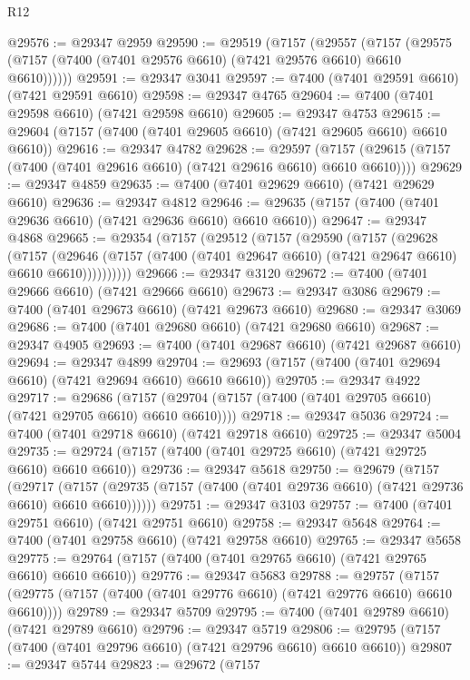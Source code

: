 \begin{lexlean}{R12}
\begin{coremodule}
@29576 := @29347 @2959
@29590 := @29519
    (@7157
      (@29557
        (@7157 (@29575 (@7157 (@7400 (@7401 @29576 @6610) (@7421 @29576 @6610) @6610 @6610))))))
@29591 := @29347 @3041
@29597 := @7400 (@7401 @29591 @6610) (@7421 @29591 @6610)
@29598 := @29347 @4765
@29604 := @7400 (@7401 @29598 @6610) (@7421 @29598 @6610)
@29605 := @29347 @4753
@29615 := @29604 (@7157 (@7400 (@7401 @29605 @6610) (@7421 @29605 @6610) @6610 @6610))
@29616 := @29347 @4782
@29628 := @29597
    (@7157 (@29615 (@7157 (@7400 (@7401 @29616 @6610) (@7421 @29616 @6610) @6610 @6610))))
@29629 := @29347 @4859
@29635 := @7400 (@7401 @29629 @6610) (@7421 @29629 @6610)
@29636 := @29347 @4812
@29646 := @29635 (@7157 (@7400 (@7401 @29636 @6610) (@7421 @29636 @6610) @6610 @6610))
@29647 := @29347 @4868
@29665 := @29354
    (@7157
      (@29512
        (@7157
          (@29590
            (@7157
              (@29628
                (@7157
                  (@29646
                    (@7157 (@7400 (@7401 @29647 @6610) (@7421 @29647 @6610) @6610 @6610))))))))))
@29666 := @29347 @3120
@29672 := @7400 (@7401 @29666 @6610) (@7421 @29666 @6610)
@29673 := @29347 @3086
@29679 := @7400 (@7401 @29673 @6610) (@7421 @29673 @6610)
@29680 := @29347 @3069
@29686 := @7400 (@7401 @29680 @6610) (@7421 @29680 @6610)
@29687 := @29347 @4905
@29693 := @7400 (@7401 @29687 @6610) (@7421 @29687 @6610)
@29694 := @29347 @4899
@29704 := @29693 (@7157 (@7400 (@7401 @29694 @6610) (@7421 @29694 @6610) @6610 @6610))
@29705 := @29347 @4922
@29717 := @29686
    (@7157 (@29704 (@7157 (@7400 (@7401 @29705 @6610) (@7421 @29705 @6610) @6610 @6610))))
@29718 := @29347 @5036
@29724 := @7400 (@7401 @29718 @6610) (@7421 @29718 @6610)
@29725 := @29347 @5004
@29735 := @29724 (@7157 (@7400 (@7401 @29725 @6610) (@7421 @29725 @6610) @6610 @6610))
@29736 := @29347 @5618
@29750 := @29679
    (@7157
      (@29717
        (@7157 (@29735 (@7157 (@7400 (@7401 @29736 @6610) (@7421 @29736 @6610) @6610 @6610))))))
@29751 := @29347 @3103
@29757 := @7400 (@7401 @29751 @6610) (@7421 @29751 @6610)
@29758 := @29347 @5648
@29764 := @7400 (@7401 @29758 @6610) (@7421 @29758 @6610)
@29765 := @29347 @5658
@29775 := @29764 (@7157 (@7400 (@7401 @29765 @6610) (@7421 @29765 @6610) @6610 @6610))
@29776 := @29347 @5683
@29788 := @29757
    (@7157 (@29775 (@7157 (@7400 (@7401 @29776 @6610) (@7421 @29776 @6610) @6610 @6610))))
@29789 := @29347 @5709
@29795 := @7400 (@7401 @29789 @6610) (@7421 @29789 @6610)
@29796 := @29347 @5719
@29806 := @29795 (@7157 (@7400 (@7401 @29796 @6610) (@7421 @29796 @6610) @6610 @6610))
@29807 := @29347 @5744
@29823 := @29672
    (@7157

\end{coremodule}
\end{lexlean}

